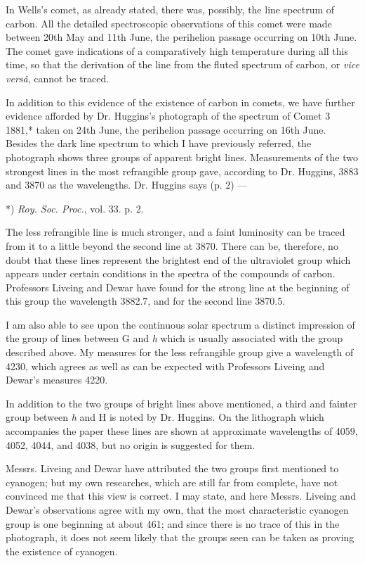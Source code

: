 \documentclass[a4paper, 12pt, oneside, polutonikogreek, english]{article}
\begin{document}
In Wells's comet, as already stated, there was, possibly, the line spectrum of carbon. All the detailed spectroscopic observations of this comet were made between 20th May and 11th June, the perihelion passage occurring on 10th June. The comet gave indications of a comparatively high temperature during all this time, so that the derivation of the line from the fluted spectrum of carbon, or \emph{vice versâ}, cannot be traced.

In addition to this evidence of the existence of carbon in comets, we have further evidence afforded by Dr. Huggins's photograph of the spectrum of Comet 3 1881,* taken on 24th June, the perihelion passage occurring on 16th June. Besides the dark line spectrum to which I have previously referred, the photograph shows three groups of apparent bright lines. Measurements of the two strongest lines in the most refrangible group gave, according to Dr. Huggins, 3883 and 3870 as the wavelengths. Dr. Huggins says (p. 2) ---

*) \emph{Roy. Soc. Proc.}, vol. 33. p. 2.

The less refrangible line is much stronger, and a faint luminosity can be traced from it to a little beyond the second line at 3870. There can be, therefore, no doubt that these lines represent the brightest end of the ultraviolet group which appears under certain conditions in the spectra of the compounds of carbon. Professors Liveing and Dewar have found for the strong line at the beginning of this group the wavelength 3882.7, and for the second line 3870.5.

I am also able to see upon the continuous solar spectrum a distinct impression of the group of lines between G and \emph{h} which is usually associated with the group described above. My measures for the less refrangible group give a wavelength of 4230, which agrees as well as can be expected with Professors Liveing and Dewar's measures 4220.

In addition to the two groups of bright lines above mentioned, a third and fainter group between \emph{h} and H is noted by Dr. Huggins. On the lithograph which accompanies the paper these lines are shown at approximate wavelengths of 4059, 4052, 4044, and 4038, but no origin is suggested for them.

Messrs. Liveing and Dewar have attributed the two groups first mentioned to cyanogen; but my own researches, which are still far from complete, have not convinced me that this view is correct. I may state, and here Messrs. Liveing and Dewar's observations agree with my own, that the most characteristic cyanogen group is one beginning at about 461; and since there is no trace of this in the photograph, it does not seem likely that the groups seen can be taken as proving the existence of cyanogen.
\end{document}
